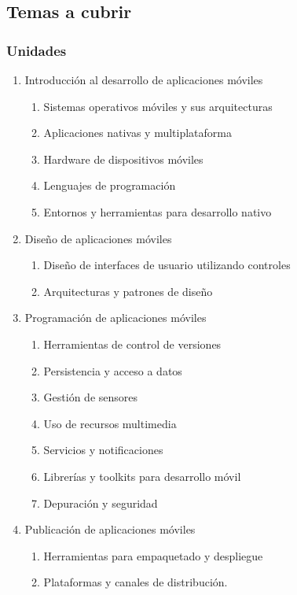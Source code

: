 \begin{frame}
\section{Temas a cubrir}

\scriptsize
\frametitle{Unidades }
\begin{enumerate}
\scriptsize
\item Introducción al desarrollo de aplicaciones móviles
\begin{enumerate}
\scriptsize
\item Sistemas operativos móviles y sus arquitecturas
\item Aplicaciones nativas y multiplataforma
\item Hardware de dispositivos móviles
\item Lenguajes de programación
\item Entornos y herramientas para desarrollo nativo
\end{enumerate}
\scriptsize
\item Diseño de aplicaciones móviles
\begin{enumerate}
\scriptsize
\item Diseño de interfaces de usuario utilizando controles
\item Arquitecturas y patrones de diseño
\end{enumerate}
\scriptsize
\item Programación de aplicaciones móviles
\begin{enumerate}
\scriptsize
\item Herramientas de control de versiones
\item Persistencia y acceso a datos
\item Gestión de sensores
\item Uso de recursos multimedia
\item Servicios y notificaciones
\item Librerías y toolkits para desarrollo móvil
\item Depuración y seguridad
\end{enumerate}
\scriptsize
\item Publicación de aplicaciones móviles
\begin{enumerate}
\scriptsize
\item Herramientas para empaquetado y despliegue
\item Plataformas y canales de distribución.
\end{enumerate}

\end{enumerate}

\end{frame}
